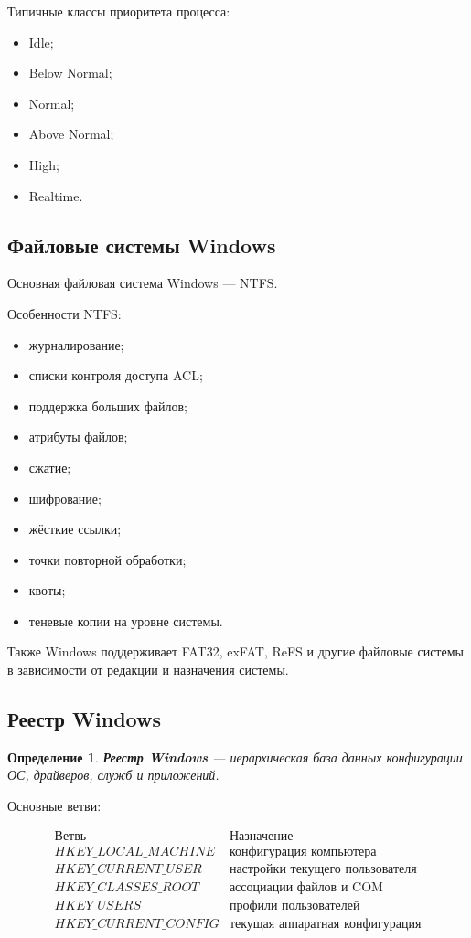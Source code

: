 \documentclass[12pt,a4paper]{article}
\newtheorem{definition}{Определение}
\begin{document}
Типичные классы приоритета процесса:

\begin{itemize}
    \item Idle;
    \item Below Normal;
    \item Normal;
    \item Above Normal;
    \item High;
    \item Realtime.
\end{itemize}

\subsection{Файловые системы Windows}

Основная файловая система Windows --- NTFS.

Особенности NTFS:

\begin{itemize}
    \item журналирование;
    \item списки контроля доступа ACL;
    \item поддержка больших файлов;
    \item атрибуты файлов;
    \item сжатие;
    \item шифрование;
    \item жёсткие ссылки;
    \item точки повторной обработки;
    \item квоты;
    \item теневые копии на уровне системы.
\end{itemize}

Также Windows поддерживает FAT32, exFAT, ReFS и другие файловые системы в зависимости от редакции и назначения системы.

\subsection{Реестр Windows}

\begin{definition}
\textbf{Реестр Windows} --- иерархическая база данных конфигурации ОС, драйверов, служб и приложений.
\end{definition}

Основные ветви:

\[
\begin{array}{c|l}
\text{Ветвь} & \text{Назначение} \\
\hline
HKEY\_LOCAL\_MACHINE & \text{конфигурация компьютера} \\
HKEY\_CURRENT\_USER & \text{настройки текущего пользователя} \\
HKEY\_CLASSES\_ROOT & \text{ассоциации файлов и COM} \\
HKEY\_USERS & \text{профили пользователей} \\
HKEY\_CURRENT\_CONFIG & \text{текущая аппаратная конфигурация}
\end{array}
\]
\end{document}
